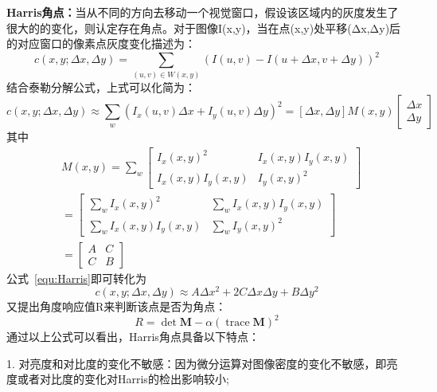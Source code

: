 \textbf{Harris角点：}当从不同的方向去移动一个视觉窗口，假设该区域内的灰度发生了很大的的变化，则认定存在角点。对于图像I(x,y)，当在点(x,y)处平移(Δx,Δy)后的对应窗口的像素点灰度变化描述为：
\begin{equation}
  c(x, y ; \Delta x, \Delta y)=\sum_{(u, v) \in W(x, y)} (I(u, v)-I(u+\Delta x, v+\Delta y))^{2}
  \label{equ:Harris}
\end{equation}
结合泰勒分解公式，上式可以化简为：
\begin{equation}
  c(x, y ; \Delta x, \Delta y) \approx \sum_{w}\left(I_{x}(u, v) \Delta x+I_{y}(u, v) \Delta y\right)^{2}=[\Delta x, \Delta y] M(x, y)\left[\begin{array}{c}{\Delta x} \\ {\Delta y}\end{array}\right]
\end{equation}
其中
\begin{equation}
  \begin{split}
   & M(x, y)=\sum_{w}\left[\begin{array}{cc}{I_{x}(x, y)^{2}} & {I_{x}(x, y) I_{y}(x, y)} \\ {I_{x}(x, y) I_{y}(x, y)} & {I_{y}(x, y)^{2}}\end{array}\right]\\
   & =\left[\begin{array}{cc}{\sum_{w} I_{x}(x, y)^{2}} & {\sum_{w} I_{x}(x, y) I_{y}(x, y)} \\ {\sum_{w} I_{x}(x, y) I_{y}(x, y)} & {\sum_{w} I_{y}(x, y)^{2}}\end{array}\right] \\
   & =\left[\begin{array}{cc}{A} & {C} \\ {C} & {B}\end{array}\right] 
  \end{split}
  \end{equation}
公式~\ref{equ:Harris}即可转化为
\begin{equation}
  c(x, y ; \Delta x, \Delta y) \approx A \Delta x^{2}+2 C \Delta x \Delta y+B \Delta y^{2}
\end{equation}
又提出角度响应值R来判断该点是否为角点：
\begin{equation}
  R=\operatorname{det} \boldsymbol{M}-\alpha(\operatorname{trace} \boldsymbol{M})^{2}
\end{equation}
通过以上公式可以看出，Harris角点具备以下特点：

1. 对亮度和对比度的变化不敏感：因为微分运算对图像密度的变化不敏感，即亮度或者对比度的变化对Harris的检出影响较小;

